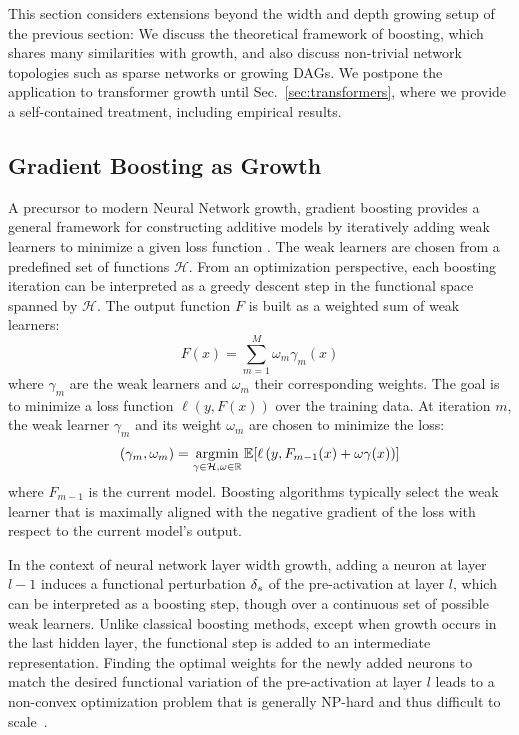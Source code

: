 This section considers extensions beyond the width and depth growing setup of the previous section: We discuss the theoretical framework of boosting, which shares many similarities with growth, and also discuss non-trivial network topologies such as sparse networks or growing DAGs. We postpone the application to transformer growth until Sec.~\ref{sec:transformers}, where we provide a self-contained treatment, including empirical results.


\subsection{Gradient Boosting as Growth}\label{sec:boosting}

A precursor to modern Neural Network growth, gradient boosting provides a general framework for constructing additive models by iteratively adding weak learners to minimize a given loss function \citep{friedman_greedy_2001}. The weak learners are chosen from a predefined set of functions $\mathcal{H}$. From an optimization perspective, each boosting iteration can be interpreted as a greedy descent step in the functional space spanned by $\mathcal{H}$. The output function $F$ is built as a weighted sum of weak learners:
$$F(x) = \sum_{m=1}^M \omega_m \gamma_m(x)$$
where $\gamma_m$ are the weak learners and $\omega_m$ their corresponding weights. The goal is to minimize a loss function $\ell{}(y, F(x))$ over the training data. At iteration $m$, the weak learner $\gamma_m$ and its weight $\omega_m$ are chosen to minimize the loss:
$$(\gamma_m, \omega_m) = \operatorname*{\arg\!\min}_{\gamma \in \mathcal{H}, \omega\in\mathbb{R}}  \mathbb{E}[\ell\left(y, F_{m-1}(x) + \omega \gamma(x)\right)]$$
where $F_{m-1}$ is the current model. 
Boosting algorithms typically select the weak learner that is maximally aligned with the negative gradient of the loss with respect to the current model's output.

In the context of neural network layer width growth, adding a neuron at layer $l-1$ induces a functional perturbation $\delta_{s}$ of the pre-activation at layer $l$, which can be interpreted as a boosting step, though over a continuous set of possible weak learners.
Unlike classical boosting methods, except when growth occurs in the last hidden layer, the functional step is added to an intermediate representation.  
Finding the optimal weights for the newly added neurons to match the desired functional variation of the pre-activation at layer $l$ leads to a non-convex optimization problem that is generally NP-hard  \citep{manurangsi2018computationalcomplexitytrainingrelus,bach_breaking_2017} and thus difficult to scale~\citep{liu_splitting_2019}.

